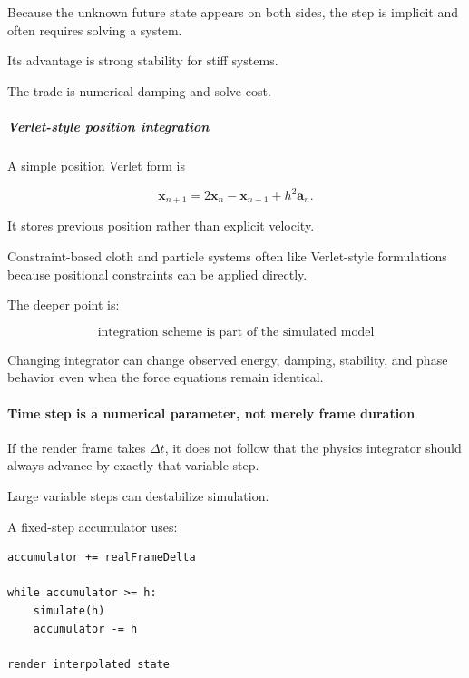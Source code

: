 Because the unknown future state appears on both sides, the step is implicit and often requires solving a system.

Its advantage is strong stability for stiff systems.

The trade is numerical damping and solve cost.

\subparagraph{Verlet-style position integration}\label{03-visual-computing-i-ch001-verlet-style-position-integration}

\hypertarget{03-visual-computing-i-ch001-verlet-style-position-integration}{}

A simple position Verlet form is

\[
\mathbf x_{n+1}
=
2\mathbf x_n
-
\mathbf x_{n-1}
+
h^2\mathbf a_n.
\]

It stores previous position rather than explicit velocity.

Constraint-based cloth and particle systems often like Verlet-style formulations because positional constraints can be applied directly.

The deeper point is:

\[
\boxed{
\text{integration scheme is part of the simulated model}
}
\]

Changing integrator can change observed energy, damping, stability, and phase behavior even when the force equations remain identical.

\paragraph{Time step is a numerical parameter, not merely frame duration}\label{03-visual-computing-i-ch001-time-step-is-a-numerical-parameter-not-merely-frame-duration}

\hypertarget{03-visual-computing-i-ch001-time-step-is-a-numerical-parameter-not-merely-frame-duration}{}

If the render frame takes \(\Delta t\), it does not follow that the physics integrator should always advance by exactly that variable step.

Large variable steps can destabilize simulation.

A fixed-step accumulator uses:

\begin{verbatim}
accumulator += realFrameDelta

while accumulator >= h:
    simulate(h)
    accumulator -= h

render interpolated state
\end{verbatim}

